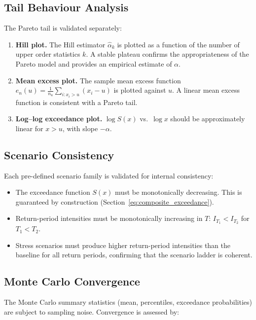 \documentclass[11pt,a4paper]{article}
\begin{document}
\subsection{Tail Behaviour Analysis}

The Pareto tail is validated separately:

\begin{enumerate}[nosep]
    \item \textbf{Hill plot.} The Hill estimator $\hat{\alpha}_k$ is plotted as a
          function of the number of upper order statistics $k$. A stable plateau
          confirms the appropriateness of the Pareto model and provides an
          empirical estimate of $\alpha$.
    \item \textbf{Mean excess plot.} The sample mean excess function
          $e_n(u) = \frac{1}{n_u}\sum_{i: x_i > u}(x_i - u)$ is plotted against $u$.
          A linear mean excess function is consistent with a Pareto tail.
    \item \textbf{Log--log exceedance plot.} $\log S(x)$ vs.\ $\log x$ should be
          approximately linear for $x > u$, with slope $-\alpha$.
\end{enumerate}

\subsection{Scenario Consistency}

Each pre-defined scenario family is validated for internal consistency:

\begin{itemize}[nosep]
    \item The exceedance function $S(x)$ must be monotonically decreasing. This is
          guaranteed by construction (Section~\ref{eq:composite_exceedance}).
    \item Return-period intensities must be monotonically increasing in $T$:
          $I_{T_1} < I_{T_2}$ for $T_1 < T_2$.
    \item Stress scenarios must produce higher return-period intensities than the
          baseline for all return periods, confirming that the scenario ladder is
          coherent.
\end{itemize}

\subsection{Monte Carlo Convergence}

The Monte Carlo summary statistics (mean, percentiles, exceedance probabilities)
are subject to sampling noise. Convergence is assessed by:
\end{document}
